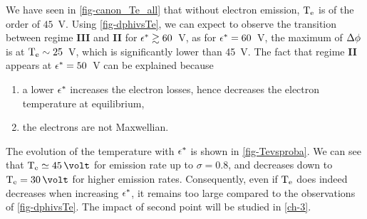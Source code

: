    We have seen in \ref{fig-canon_Te_all} that without electron emission, $\mathrm{T_e}$ is of the order of $45$~V.
   Using \cref{fig-dphivsTe}, we can expect to observe the transition between regime {\bf III} and {\bf II} for $\epsilon^{*} \gtrsim 60$~V, as for $\epsilon^{*} = 60$~V, the maximum of $\Delta \phi$ is at $\mathrm{T_e}\sim 25$~V, which is significantly lower than 45~V.
   The fact that regime {\bf II} appears at $\epsilon^{*}=50$~V can be explained because
   \begin{enumerate}
     \item a lower $\epsilon^{*}$ increases the electron losses, hence decreases the electron temperature at equilibrium,
     \item the electrons are not Maxwellian.
   \end{enumerate}
   
   The evolution of the temperature with $\epsilon^{*}$ is shown in \cref{fig-Tevsproba}.
   We can see that $\Te \simeq 45\,\volt$ for emission rate up to $\sigma = 0.8$, and decreases down to $\Te=30\,\volt$ for higher emission rates.
   Consequently, even if $\mathrm{T_e}$ does indeed decreases when increasing $\epsilon^{*}$, it remains too large compared to the observations of \cref{fig-dphivsTe}.
   The impact of second point will be studied in \cref{ch-3}.
   
   
  